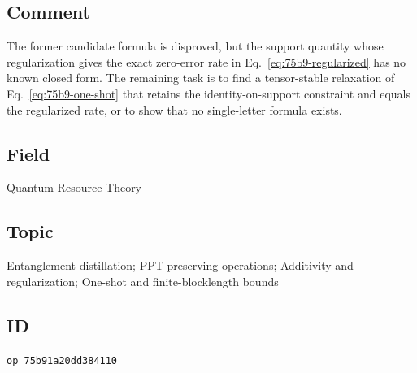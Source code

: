 \subsection*{Comment}

The former candidate formula is disproved, but the support quantity whose
regularization gives the exact zero-error rate in
Eq.~\eqref{eq:75b9-regularized} has no known closed form.  The remaining
task is to find a tensor-stable relaxation of Eq.~\eqref{eq:75b9-one-shot}
that retains the identity-on-support constraint and equals the regularized
rate, or to show that no single-letter formula exists.

\subsection*{Field}

Quantum Resource Theory

\subsection*{Topic}

Entanglement distillation; PPT-preserving operations; Additivity and regularization; One-shot and finite-blocklength bounds

\subsection*{ID}

\texttt{op\_75b91a20dd384110}
